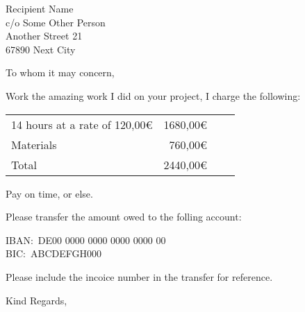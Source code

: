 \documentclass[
	11pt,
	a4paper,
	letter,
	parskip=yes,
	fromemail,
	fromphone
]{scrlttr2} %
\date{\formatdate{24}{11}{2023} }
\begin{document}
\begin{letter}{%
		Recipient Name\\
		c/o Some Other Person\\
		Another Street 21\\[\medskipamount]
		67890 Next City}


	\opening{To whom it may concern,}

	Work the amazing work I did on your project, I charge the following:

	\begin{tabularx}{\textwidth}{@{}Xr@{}Xr}
		14 hours at a rate of 120,00€		&  1680,00€ \\
		Materials 											&   760,00€ \\
		\midrule
		Total														& 2440,00€ \\
		\bottomrule
	\end{tabularx}

	Pay on time, or else.

	Please transfer the amount owed to the folling account:

	IBAN:\ DE00 0000 0000 0000 0000 00\\
	BIC:\ ABCDEFGH000

	Please include the incoice number in the transfer for reference.

	\closing{Kind Regards,}

\end{letter}
\end{document}

